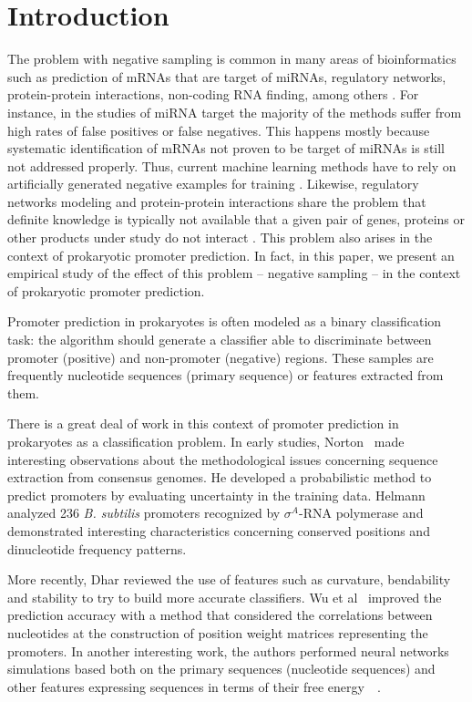 \documentclass[conference]{IEEEtran}
\begin{document}
\section{Introduction}
\label{sec:intro}

The problem with negative sampling is common in many areas of bioinformatics such as prediction of mRNAs that are target of miRNAs, regulatory networks, protein-protein interactions, non-coding RNA finding, among others \cite{bandyopadhyay2009,cerulo2010,park2011,wang2006}. For instance, in the studies of miRNA target the majority of the methods suffer from high rates of false positives or false negatives. This happens mostly because systematic identification of mRNAs not proven to be target of miRNAs is still not addressed properly. Thus, current machine learning methods have to rely on artificially generated negative examples for training \cite{bandyopadhyay2009}. Likewise, regulatory networks modeling and protein-protein interactions share the problem that definite knowledge is typically not available that a given pair of genes, proteins or other products under study do not interact \cite{cerulo2010,park2011}. This problem  also arises in the context of prokaryotic promoter prediction.  In fact, in this paper, we present an empirical study of the effect of this problem -- negative sampling -- in the context of prokaryotic promoter prediction.

Promoter prediction in prokaryotes is often modeled as a binary classification task: the algorithm should generate a classifier able to discriminate between promoter (positive) and non-promoter (negative) regions. These samples are frequently nucleotide sequences (primary sequence) or features extracted from them. 

There is a great deal of work in this context of promoter prediction in prokaryotes as a classification problem. In early studies, Norton~\cite{norton1994} made interesting observations about the methodological issues concerning sequence extraction from consensus genomes. He developed a probabilistic method to predict promoters by evaluating uncertainty in the training data. Helmann~\cite{helmann1995} analyzed 236 {\it B. subtilis} promoters recognized by ${\sigma }^{{A}}$-RNA polymerase and demonstrated interesting characteristics concerning conserved positions and dinucleotide frequency patterns. 

More recently, Dhar \cite{dhar2010} reviewed the use of features such as curvature, bendability and stability to try to build more accurate classifiers. Wu et al~\cite{wu2011} improved the prediction accuracy with a method that considered the correlations between nucleotides at the construction of position weight matrices representing the promoters. In another interesting work, the authors performed neural networks simulations based both on the primary sequences (nucleotide sequences) and other features expressing sequences in terms of their free energy~~\cite{avila2011}.
\end{document}
